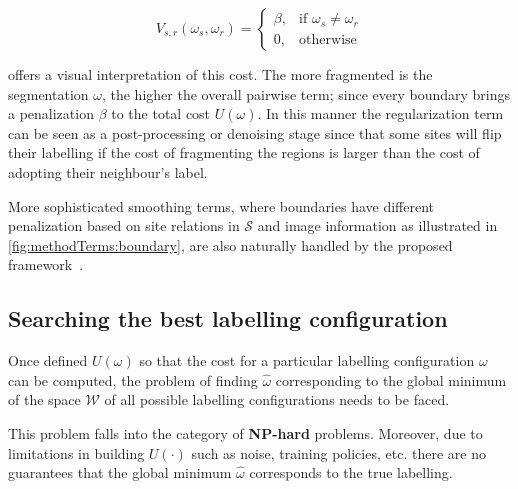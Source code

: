 \begin{equation}
V_{s,r}(\omega_s,\omega_r) = 
\begin{cases}
    \beta, & \text{if } \omega_s \ne \omega_r\\
    0,              & \text{otherwise}
\end{cases}
\label{eq:smoothing}
\end{equation}

 offers a visual interpretation of this cost.
The more fragmented is the segmentation $\omega$, the higher the overall pairwise term; since every boundary brings a penalization $\beta$ to the total cost $U(\omega)$.
In this manner the regularization term can be seen as a post-processing or denoising stage since that some sites will flip their labelling if the cost of fragmenting the regions is larger than the cost of adopting their neighbour's label. 

More sophisticated smoothing terms, where boundaries have different penalization based on site relations in $\mathcal{S}$ and image information as illustrated in \cref{fig:methodTerms:boundary}, are also naturally handled by the proposed framework~\cite{massich2013phd}.


\subsection{Searching the best labelling configuration} \label{sec:method:min}
Once defined $U(\omega)$ so that the cost for a particular labelling configuration $\omega$ can be computed, the problem of finding $\hat{\omega}$ corresponding to the global minimum of the space $\mathcal{W}$ of all possible labelling configurations needs to be faced. 

This problem falls into the category of \textbf{NP-hard} problems. 
Moreover, due to limitations in building $U(\cdot)$ such as noise, training policies, etc. there are no guarantees that the global minimum $\hat{\omega}$ corresponds to the true labelling.

